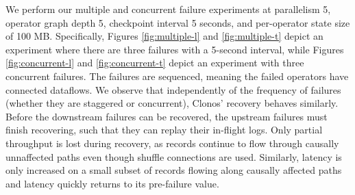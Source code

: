 \documentclass[sigconf]{acmart}
\begin{document}
We perform our multiple and concurrent failure experiments at parallelism 5, operator graph depth 5, checkpoint interval 5 seconds, and per-operator state size of 100 MB. Specifically, Figures \ref{fig:multiple-l} and \ref{fig:multiple-t} depict an experiment where there are three failures with a 5-second interval, while Figures \ref{fig:concurrent-l} and \ref{fig:concurrent-t} depict an experiment with three concurrent failures. 
The failures are sequenced, meaning the failed operators have connected dataflows. 
We observe that independently of the frequency of failures (whether they are staggered or concurrent), Clonos' recovery behaves similarly. Before the downstream failures can be recovered, the upstream failures must finish recovering, such that they can replay their in-flight logs.
Only partial throughput is lost during recovery, as records continue to flow through causally unnaffected paths even though shuffle connections are used. Similarly, latency is only increased on a small subset of records flowing along causally affected paths and latency quickly returns to its pre-failure value.


\vspace{-5mm}
\end{document}
